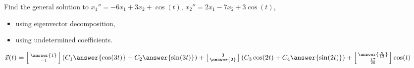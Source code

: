 \documentclass{ximera}
\begin{document}
\begin{exercise}
    Find the general solution to $x_1'' = -6x_1+ 3x_2 + \cos (t)$,  $x_2'' = 2x_1 -7x_2 + 3\cos (t)$,
    \begin{itemize}
        \item using eigenvector decomposition,
        \item using undetermined coefficients.
    \end{itemize}
    $\vec{x}(t) = \left[\begin{smallmatrix} \answer{1} \\ -1 \end{smallmatrix}\right](C_1\answer{\cos(3t)} + C_2\answer{\sin(3t)}) + \left[\begin{smallmatrix} 3 \\ \answer{2} \end{smallmatrix}\right](C_3\cos(2t) + C_4\answer{\sin(2t)}) + \left[\begin{smallmatrix} \answer{\frac{8}{13}} \\ \frac{17}{26} \end{smallmatrix}\right]\cos(t)$
\end{exercise}
\end{document}
